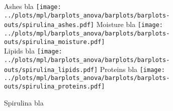 
\begin{figure}[H]
\centering
	\subcaptionbox%
	{Ashes bla\label{subfig:spirulina_ashes}}%
		{\texttt{[image: ../plots/mpl/barplots\_anova/barplots/barplots-outs/spirulina\_ashes.pdf]}}%
\hfill
	\subcaptionbox%
	{Moisture bla\label{subfig:spirulina_moisture}}%
		{\texttt{[image: ../plots/mpl/barplots\_anova/barplots/barplots-outs/spirulina\_moisture.pdf]}}%
\\[2ex]
	\subcaptionbox%
	{Lipids bla\label{subfig:spirulina_lipids}}%
		{\texttt{[image: ../plots/mpl/barplots\_anova/barplots/barplots-outs/spirulina\_lipids.pdf]}}%
\hfill
	\subcaptionbox%
	{Proteins bla\label{subfig:spirulina_proteins}}%
		{\texttt{[image: ../plots/mpl/barplots\_anova/barplots/barplots-outs/spirulina\_proteins.pdf]}}%
\caption%
{Spirulina bla}
\label{fig:spirulinabla}
\end{figure}
